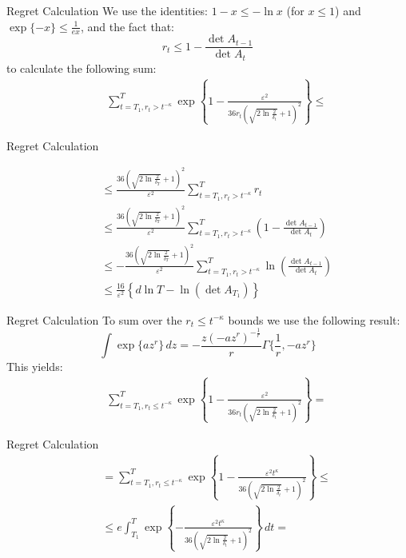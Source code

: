 \documentclass{beamer}
\begin{document}
\begin{frame}{Regret Calculation}
We use the identities:  $1-x\leq -\ln{x}$ (for $x\leq1$) and $\exp\{-x\}\leq\frac{1}{ex}$, and the fact that:
\begin{equation}
 r_t\leq 1-\frac{\det{A_{t-1}}}{\det{A_t}}
\end{equation}
to calculate the following sum:
\begin{eqnarray}
&&\sum\limits_{t=T_1,r_t> t^{-\kappa}}^{T}\exp\left\{1-\frac{\varepsilon^2}{36r_t\left(\sqrt{2\ln{\frac{2}{\delta_t}}}+1\right)^2}\right\}\leq\nonumber
\end{eqnarray}
\end{frame}
\begin{frame}{Regret Calculation}

\begin{eqnarray}
&&\leq\frac{36\left(\sqrt{2\ln{\frac{2}{\delta_T}}}+1\right)^2}{\varepsilon^2}\sum\limits_{t=T_1,r_t>t^{-\kappa}}^{T}r_t\nonumber\\
&&\leq\frac{36\left(\sqrt{2\ln{\frac{2}{\delta_T}}}+1\right)^2}{\varepsilon^2}\sum\limits_{t=T_1,r_t>t^{-\kappa}}^{T}\left(1-\frac{\det{A_{t-1}}}{\det{A_t}}\right)\nonumber\\
&&\leq -\frac{36\left(\sqrt{2\ln{\frac{2}{\delta_T}}}+1\right)^2}{\varepsilon^2}\sum\limits_{t=T_1,r_t>t^{-\kappa}}^{T}\ln{\left(\frac{\det{A_{t-1}}}{\det{A_t}}\right)}\nonumber\\
&&\leq\frac{16}{\varepsilon^2}\left\{d\ln{T}- \ln\left(\det{A_{T_1}}\right)\right\}
\label{sum_bound_rt_large2}
\end{eqnarray}

\end{frame}

\begin{frame}{Regret Calculation}
To sum over the $r_t\leq t^{-\kappa}$ bounds we use the following result: 
\begin{equation}
\int\exp\{az^r\}\,dz=-\frac{z(-az^r)^{-\frac{1}{r}}}{r}\Gamma\{\frac{1}{r},-az^r\}
\label{incomplete_gamma}
\end{equation}
This yields:
\begin{eqnarray}
&&\sum\limits_{t=T_1,r_t\leq t^{-\kappa}}^{T}\exp\left\{1-\frac{\varepsilon^2}{36r_t\left(\sqrt{2\ln{\frac{2}{\delta_t}}}+1\right)^2}\right\}=\nonumber
\end{eqnarray}
\end{frame}

\begin{frame}{Regret Calculation}
\begin{eqnarray}
&&=\sum\limits_{t=T_1,r_t\leq t^{-\kappa}}^{T}\exp\left\{1-\frac{\varepsilon^2t^{\kappa}}{36\left(\sqrt{2\ln{\frac{2}{\delta_t}}}+1\right)^2}\right\}\leq\nonumber\\
&&\leq e\int_{T_1}^{T}\exp\left\{-\frac{\varepsilon^2t^{\kappa}}{36\left(\sqrt{2\ln{\frac{2}{\delta_t}}}+1\right)^2}\right\}\,dt=\nonumber
\end{eqnarray}
\end{frame}
\end{document}
